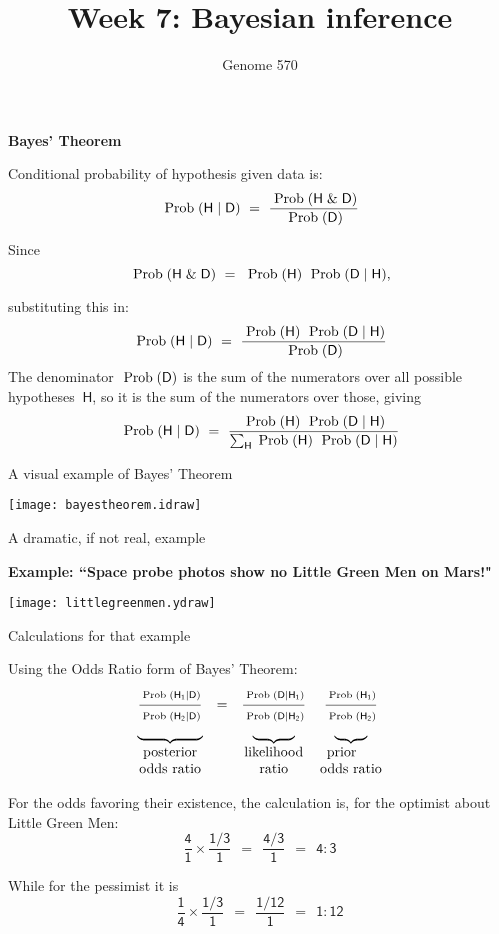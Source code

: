 \documentclass[bluish,slideColor,colorBG,pdf]{prosper}
\title{Week 7:  Bayesian inference}
\author{Genome 570}
\def\prob{{\rm \;Prob\;}}
\begin{document}
\maketitle

\begin{slide}[Replace]{\bf Bayes' Theorem}

Conditional probability of hypothesis given data is:
\[
\mathsf{\prob(H\;|\;D)\ = \ {\prob(H\;\&\;D) \over \prob(D)}}
\]

Since
\[
\mathsf{\prob(H\;\&\;D)\ =\ \prob(H)\ \prob(D\;|\;H)},
\]

substituting this in:
\[
\mathsf{\prob(H\;|\;D)\ = \ {\prob(H)\ \prob(D\;|\;H) \over \prob(D)}}
\]
The denominator $\mathsf{\prob(D)}$
is the sum of the numerators over all possible hypotheses $~\mathsf{H}$, so it
is the sum of the numerators over those, giving
\[
\mathsf{\prob(H\;|\;D)\ = \ {\prob(H)\ \prob(D\;|\;H) \over \sum_H \prob(H)\ \prob(D\;|\;H)}}
\]

\end{slide}

\begin{slide}[Replace]{A visual example of Bayes' Theorem}
\bigskip

\centerline{\texttt{[image: bayestheorem.idraw]}}

\end{slide}

\begin{slide}[Replace]{A dramatic, if not real, example}

\centerline{\bf Example: ``Space probe photos show no Little Green Men on Mars!"}
\medskip

\centerline{\texttt{[image: littlegreenmen.ydraw]}}

\end{slide}

\begin{slide}[Replace]{Calculations for that example}

\noindent
Using the Odds Ratio form of Bayes' Theorem:
\[
\begin{array}{c c c c}
\mathsf{\frac{\prob(H_1|D)\raisebox{-1pt}{\strut}}{\prob(H_2|D)\raisebox{1pt}{\strut}}} & \mathsf{=} & \mathsf{\frac{\prob(D|H_1)\raisebox{-1pt}{\strut}}{\prob(D|H_2)\raisebox{1pt}{\strut}}} &  \mathsf{\frac{\prob(H_1)\raisebox{-1pt}{\strut}}{\prob(H_2)\raisebox{1pt}{\strut}}}\\
\mathsf{\underbrace{~~~~~~~~~~~~~~}} & & \mathsf{\underbrace{~~~~~~~~~}} & \mathsf{\underbrace{~~~~~~~}}\\
{\rm posterior} & & {\rm likelihood} & {\rm prior~~~~}\\
{\rm odds~ratio} & & {\rm ratio} & {\rm odds~ratio}
\end{array}
\]

\noindent
For the odds favoring their existence, the calculation is, for the optimist
about Little Green Men:
\[
\mathsf{\frac{4}{1} \times \frac{1/3}{1} \ \ = \ \ \frac{4/3}{1} \ \ = \ \ 4:3}
\]

\noindent
While for the pessimist it is
\[
\mathsf{\frac{1}{4} \times \frac{1/3}{1} \ \ = \ \ \frac{1/12}{1} \ \ = \ \ 1:12}
\]


\end{slide}
\end{document}
